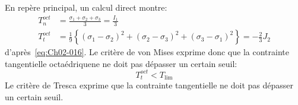 En repère principal, un calcul direct montre: 
\begin{equation}
    \begin{aligned}
        T_n^{oct} &= \frac{\sigma_1+\sigma_2+\sigma_3}{3} = \frac{I_1}{3} \\
        T_t^{oct} &= \frac{1}{9}\left\{ \left(\sigma_1-\sigma_2\right)^2 + \left(\sigma_2-\sigma_3\right)^2 + \left(\sigma_3-\sigma_1\right)^2 \right\} = -\frac{2}{3} J_2
    \end{aligned}
    \label{eq:Ch05-066}
\end{equation}
d'après~\eqref{eq:Ch02-016}.
Le critère de von Mises exprime donc que la contrainte tangentielle octaédriquene ne doit pas dépasser un certain seuil: 
\begin{equation}
    T_t^{oct} < T_{\mathrm{lim}}
    \label{eq:Ch05-067}
\end{equation}
Le critère de Tresca exprime que la contrainte tangentielle ne doit pas dépasser un certain seuil.
